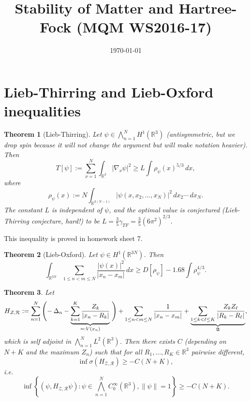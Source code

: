 \documentclass[11pt]{amsart}
\newcommand{\R}{\mathbb{R}}
\newtheorem{thm}{Theorem}
\theoremstyle{definition}
\theoremstyle{definition}
\theoremstyle{definition}
\numberwithin{equation}{section}
\begin{document}
\title[]{Stability of Matter and Hartree-Fock (MQM WS2016-17)}
\date{\today}

\maketitle

\section{Lieb-Thirring and Lieb-Oxford inequalities}

\begin{thm}[Lieb-Thirring]
Let $\psi\in\bigwedge_{n=1}^NH^1(\R^3)$ (antisymmetric, but we drop spin because it will not change the argument but will make notation heavier). Then
\begin{equation}\label{eqn:lt}
T[\psi]:=\sum_{\nu=1}^N\int_{\R^3}|\nabla_\nu \psi|^2\ge L\int\rho_\psi(x)^{5/3}\,dx,
\end{equation}
where
\[
\rho_\psi(x):=N\int_{\R^{3(N-1)}}|\psi(x,x_2,\ldots,x_N)|^2\,dx_2\cdots\,dx_N.
\]
The constant $L$ is independent of $\psi$, and the optimal value is conjectured (Lieb-Thirring conjecture, hard!) to be $L=\frac{3}{5}\gamma_{TF}=\frac{3}{5}(6\pi^2)^{2/3}$.
\end{thm}
This inequality is proved in homework sheet 7.

\begin{thm}[Lieb-Oxford]
Let $\psi\in H^1(\R^{3N})$. Then
\begin{equation}\label{eqn:lieb-oxford}
\int_{\R^{3N}}\sum_{1\le n<m\le N}\frac{|\psi(x)|^2}{|x_n-x_m|}\,dx\ge D[\rho_\psi]-1.68\int\rho_\psi^{4/3}.
\end{equation}
\end{thm}


\begin{thm}
Let 
\begin{equation}\label{eqn:hamiltonian}
H_{\mathcal{Z},\mathcal{R}}:=\sum_{n=1}^N\left(\vphantom{\sum_{k=1}^k\frac{Z_k}{|x_n-R_k|}}\right.\!\!-\Delta_n-\underbrace{\sum_{k=1}^K\frac{Z_k}{|x_n-R_k|}}_{=:V(x_n)}\left.\vphantom{\sum_{k=1}^N}\right)+\sum_{1\le n<m\le N}\frac{1}{|x_n-x_m|}+\underbrace{\sum_{1\le k<\ell\le K}\frac{Z_kZ_\ell}{|R_k-R_\ell|}}_{\mathfrak{A}},
\end{equation}
which is self adjoint in $\bigwedge_{n=1}^NL^2(\R^3)$. Then there exists $C$ (depending on $N+K$ and the maximum $Z_n$) such that for all $R_1,\ldots,R_K\in\R^3$ pairwise different,
\begin{equation}
\inf \sigma(H_{\mathcal{Z},\mathcal{R}})\ge -C(N+K),
\end{equation}
i.e.
\[
\inf\left\{(\psi,H_{\mathcal{Z},\mathcal{R}}\psi):\psi\in\bigwedge_{n=1}^NC_0^\infty(\R^3),\|\psi\|=1\right\}\ge-C(N+K).
\]
\end{thm}
\end{document}
